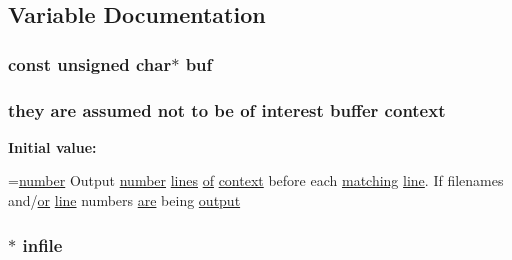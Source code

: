 \subsection{Variable Documentation}
\subsubsection[{\texorpdfstring{buf}{buf}}]{\setlength{\rightskip}{0pt plus 5cm}const unsigned char$\ast$ buf}\hypertarget{group__APACHE__CORE__MD5_ga15c3223b2bd62642545a6a0fecf9ca9b}{}\label{group__APACHE__CORE__MD5_ga15c3223b2bd62642545a6a0fecf9ca9b}
\subsubsection[{\texorpdfstring{context}{context}}]{\setlength{\rightskip}{0pt plus 5cm}they {\bf are} assumed {\bf not} {\bf to} {\bf be} {\bf of} interest {\bf buffer} context}\hypertarget{group__APACHE__CORE__MD5_ga651ed26971b1d49911883c4eb87db1ad}{}\label{group__APACHE__CORE__MD5_ga651ed26971b1d49911883c4eb87db1ad}
{\bfseries Initial value\+:}
\begin{DoxyCode}
=\hyperlink{pcre_8txt_adc6b34282f003848b6aa3219677b1481}{number}
                 Output \hyperlink{pcre_8txt_adc6b34282f003848b6aa3219677b1481}{number} \hyperlink{pcre_8txt_a8aeee69499fbebf9378d4c7d71776d3f}{lines} \hyperlink{pcre_8txt_a9d5b55a535a7d176d14b62d664b47b4d}{of} \hyperlink{group__APACHE__CORE__MD5_ga651ed26971b1d49911883c4eb87db1ad}{context} before each 
      \hyperlink{pcregrep_8txt_a48f1285cbc2f880efa6527e2a20a2afa}{matching} \hyperlink{group__APACHE__CORE__LOG_gaa843820216dea79b53a16310cb08e8dd}{line}.  If
                 filenames and/\hyperlink{pcretest_8txt_a1e1dbf0220a28f9a8c394172dd6da171}{or} \hyperlink{group__APACHE__CORE__LOG_gaa843820216dea79b53a16310cb08e8dd}{line} numbers \hyperlink{pcre_8txt_a98da773651c0ef9992aa9a7bab588058}{are} being \hyperlink{pcregrep_8txt_acf47d950a4853a501d6b975b394de5e5}{output}
\end{DoxyCode}
\subsubsection[{\texorpdfstring{infile}{infile}}]{$\ast$ infile}\hypertarget{group__APACHE__CORE__MD5_ga3fb008193e92b33c1bb53a980b708b75}{}\label{group__APACHE__CORE__MD5_ga3fb008193e92b33c1bb53a980b708b75}
